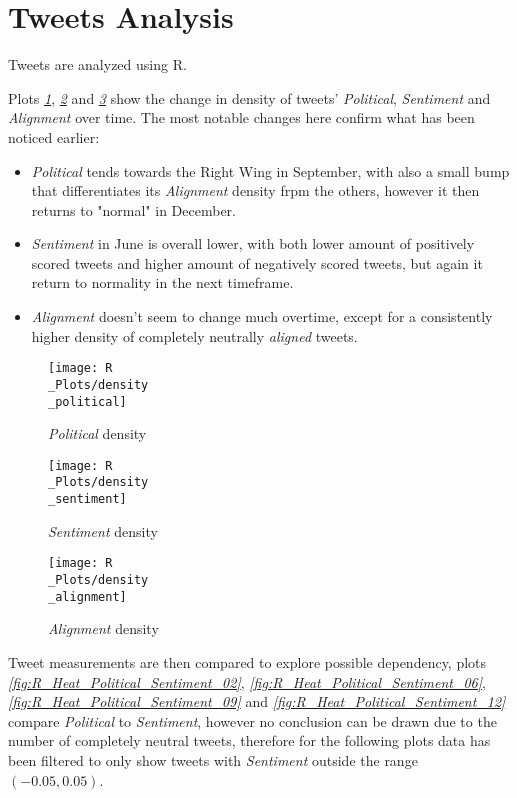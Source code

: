 \documentclass[twoside,twocolumn]{article}
\begin{document}
	
	\newpage
	\section{Tweets Analysis}
	Tweets are analyzed using R.
	
	Plots \textit{\ref{fig:R_density_political}}, \textit{\ref{fig:R_density_sentiment}} and \textit{\ref{fig:R_density_alignment}} show the change in density of tweets' \textit{Political}, \textit{Sentiment} and \textit{Alignment} over time.
	The most notable changes here confirm what has been noticed earlier:
	\begin{itemize}[noitemsep]
		\item\textit{Political} tends towards the Right Wing in September, with also a small bump that differentiates its \textit{Alignment} density frpm the others, however it then returns to "normal" in December.
		\item \textit{Sentiment} in June is overall lower, with both lower amount of positively scored tweets and higher amount of negatively scored tweets, but again it return to normality in the next timeframe.
		\item \textit{Alignment} doesn't seem to change much overtime, except for a consistently higher density of completely neutrally \textit{aligned} tweets.
	\end{itemize}
	\begin{figure}
		\texttt{[image: R\\\_Plots/density\\\_political]}
		\caption{\textit{Political} density}\label{fig:R_density_political}
	\end{figure}
	\begin{figure}
		\texttt{[image: R\\\_Plots/density\\\_sentiment]}
		\caption{\textit{Sentiment} density}\label{fig:R_density_sentiment}
	\end{figure}
	\begin{figure}
		\texttt{[image: R\\\_Plots/density\\\_alignment]}
		\caption{\textit{Alignment} density}\label{fig:R_density_alignment}
	\end{figure}
	\newpage
	
	Tweet measurements are then compared to explore possible dependency, plots \textit{\ref{fig:R_Heat_Political_Sentiment_02}}, \textit{\ref{fig:R_Heat_Political_Sentiment_06}}, \textit{\ref{fig:R_Heat_Political_Sentiment_09}} and \textit{\ref{fig:R_Heat_Political_Sentiment_12}} compare \textit{Political} to \textit{Sentiment}, however no conclusion can be drawn due to the number of completely neutral tweets, therefore for the following plots data has been filtered to only show tweets with \textit{Sentiment} outside the range $(-0.05,0.05)$.
	
\end{document}
